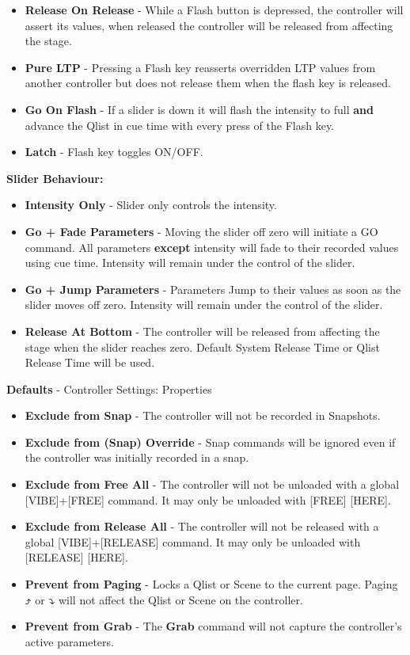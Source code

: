 \documentclass[
]{article}
\begin{document}
\begin{itemize}
\item
  \textbf{Release On Release} - While a Flash button is depressed, the controller will assert its values, when released the controller will be released from affecting the stage.
\item
  \textbf{Pure LTP} - Pressing a Flash key reasserts overridden LTP values from another controller but does not release them when the flash key is released.
\item
  \textbf{Go On Flash} - If a slider is down it will flash the intensity to full \textbf{and} advance the Qlist in cue time with every press of the Flash key.
\item
  \textbf{Latch} - Flash key toggles ON/OFF.
\end{itemize}

\textbf{Slider Behaviour:}

\begin{itemize}
\item
  \textbf{Intensity Only} - Slider only controls the intensity.
\item
  \textbf{Go + Fade Parameters} - Moving the slider off zero will initiate a GO command. All parameters \textbf{except} intensity will fade to their recorded values using cue time. Intensity will remain under the control of the slider.
\item
  \textbf{Go + Jump Parameters} - Parameters Jump to their values as soon as the slider moves off zero. Intensity will remain under the control of the slider.
\item
  \textbf{Release At Bottom} - The controller will be released from affecting the stage when the slider reaches zero. Default System Release Time or Qlist Release Time will be used.
\end{itemize}

\textbf{Defaults} - Controller Settings: Properties

\begin{itemize}
\item
  \textbf{Exclude from Snap} - The controller will not be recorded in Snapshots.
\item
  \textbf{Exclude from (Snap) Override} - Snap commands will be ignored even if the controller was initially recorded in a snap.
\item
  \textbf{Exclude from Free All} - The controller will not be unloaded with a global {[}VIBE{]}+{[}FREE{]} command. It may only be unloaded with {[}FREE{]} {[}HERE{]}.
\item
  \textbf{Exclude from Release All} - The controller will not be released with a global {[}VIBE{]}+{[}RELEASE{]} command. It may only be unloaded with {[}RELEASE{]} {[}HERE{]}.
\item
  \textbf{Prevent from Paging} - Locks a Qlist or Scene to the current page. Paging ⤴ or ⤵ will not affect the Qlist or Scene on the controller.
\item
  \textbf{Prevent from Grab} - The \textbf{Grab} command will not capture the controller's active parameters.
\end{itemize}
\end{document}
